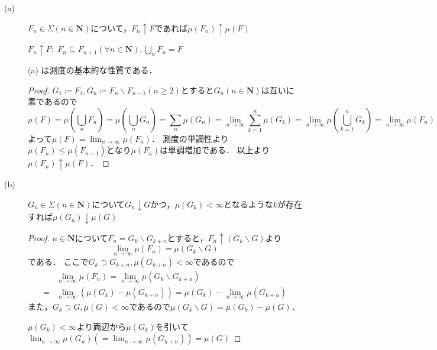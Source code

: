 \documentclass{jsarticle}
\begin{document}
\begin{description}
    \item[(a)] $F_n\in\Sigma(n\in\mathbf{N})$について，$F_n\uparrow F$であれば$\mu(F_n)\uparrow \mu(F)$ \par
    $F_n\uparrow F\colon$ $F_n\subseteq F_{n+1}(\forall n\in\mathbf{N}),\bigcup_n F_n=F$
    
    (a) は測度の基本的な性質である．
        
        \begin{proof}
            $G_1\coloneqq F_1,G_n\coloneqq F_n\backslash F_{n-1}(n\geq 2)$とすると$G_n(n\in\mathbf{N})$は互いに素であるので
            \begin{equation}
                \mu(F)=\mu(\bigcup_n F_n)=\mu(\bigcup_n G_n)=\sum_n\mu(G_n)=\lim_{n\to\infty}\sum_{k=1}^{n} \mu(G_k) = \lim_{n\to\infty} \mu(\bigcup_{k=1}^{n} G_k) = \lim_{n\to\infty} \mu(F_n) \nonumber
            \end{equation}
            よって$\mu(F)=\lim_{n\to\infty} \mu(F_n)$．
            測度の単調性より$\mu(F_n)\leq\mu(F_{n+1})$となり$\mu(F_n)$は単調増加である．
            以上より$\mu(F_n)\uparrow \mu(F)$．
        \end{proof}
        
    \item[(b)] $G_n\in\Sigma(n\in\mathbf{N})$について$G_n\downarrow G$かつ，$\mu(G_k)<\infty$となるような$k$が存在すれば$\mu(G_n)\downarrow \mu(G)$

        \begin{proof}
            $n\in\mathbf{N}$について$F_n=G_k\backslash G_{k+n}$とすると，$F_n\uparrow (G_k\backslash G)$より
            \begin{equation}
                \lim_{n\to\infty}\mu(F_n)=\mu(G_k\backslash G) \nonumber
            \end{equation}である．
            ここで$G_k\supset G_{k+n},\mu(G_{k+n})<\infty$であるので
            \begin{align}
                &\lim_{n\to\infty} \mu(F_n)=\lim_{n\to\infty}\mu(G_k\backslash G_{k+n}) \nonumber \\
                =&\lim_{n\to\infty} \left( \mu(G_k)-\mu(G_{k+n}) \right) =\mu(G_k) - \lim_{n\to\infty}\mu(G_{k+n}) \nonumber
            \end{align}
            また，$G_k\supset G,\mu(G)<\infty$であるので$\mu(G_k\backslash G)=\mu(G_k)-\mu(G)$．
            
            $\mu(G_k)<\infty$より両辺から$\mu(G_k)$を引いて$\lim_{n\to\infty}\mu(G_{n}) \left( =\lim_{n\to\infty}\mu(G_{k+n}) \right) =\mu(G)$
        \end{proof}   
    

\end{description}
\end{document}
